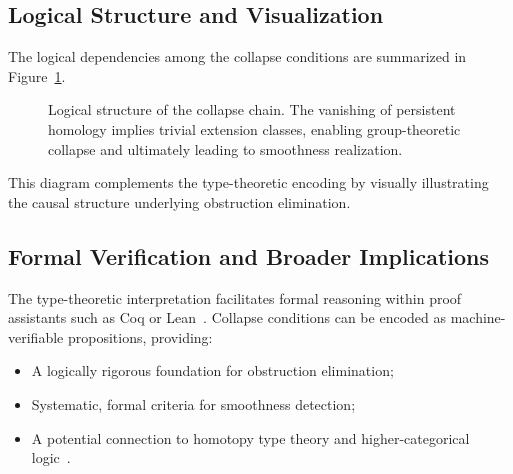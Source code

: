\documentclass[11pt]{article}
\begin{document}
\subsection{Logical Structure and Visualization}

The logical dependencies among the collapse conditions are summarized in Figure~\ref{fig:typechain}.

\begin{figure}[h]
\centering
{}
\caption{Logical structure of the collapse chain. The vanishing of persistent homology implies trivial extension classes, enabling group-theoretic collapse and ultimately leading to smoothness realization.}
\label{fig:typechain}
\end{figure}

This diagram complements the type-theoretic encoding by visually illustrating the causal structure underlying obstruction elimination.

\subsection{Formal Verification and Broader Implications}

The type-theoretic interpretation facilitates formal reasoning within proof assistants such as Coq or Lean~\cite{CoqManual2017}. Collapse conditions can be encoded as machine-verifiable propositions, providing:

\begin{itemize}
    \item A logically rigorous foundation for obstruction elimination;
    \item Systematic, formal criteria for smoothness detection;
    \item A potential connection to homotopy type theory and higher-categorical logic~\cite{HOTT2013}.
\end{itemize}
\end{document}
